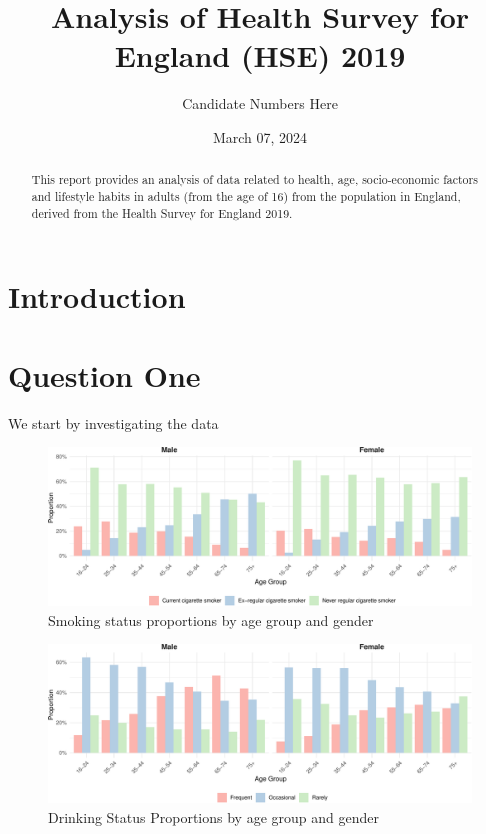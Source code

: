 \documentclass[
  11pt,
]{article}
\title{Analysis of Health Survey for England (HSE) 2019}
\author{Candidate Numbers Here}
\date{March 07, 2024}
\begin{document}
\maketitle
\begin{abstract}
This report provides an analysis of data related to health, age,
socio-economic factors and lifestyle habits in adults (from the age of
16) from the population in England, derived from the Health Survey for
England 2019.
\end{abstract}

\newpage

\section{Introduction}\label{introduction}

\section{Question One}\label{question-one}

We start by investigating the data

\begin{figure}
\centering
\includegraphics{Coursework_files/figure-latex/output smoking by age plot-1.pdf}
\caption{Smoking status proportions by age group and gender}
\end{figure}

\begin{figure}
\centering
\includegraphics{Coursework_files/figure-latex/output drinking by age plot-1.pdf}
\caption{Drinking Status Proportions by age group and gender}
\end{figure}
\end{document}
